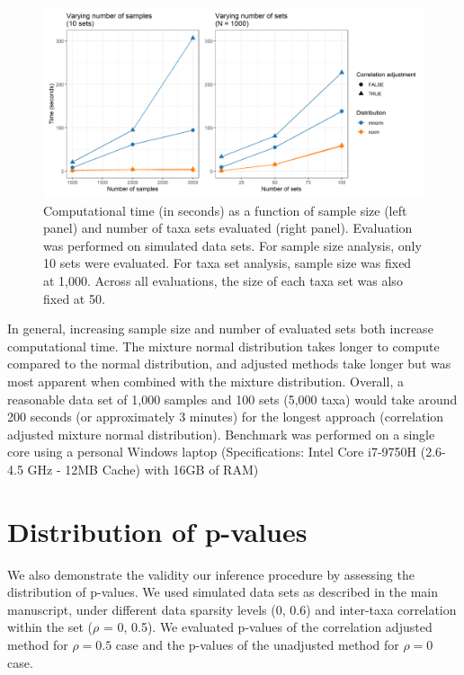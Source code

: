 \documentclass{article}
\begin{document}
\begin{figure}[!ht]
    \centering
    \includegraphics[width=\textwidth]{figures/performance.png}
    \caption{Computational time (in seconds) as a function of sample size (left panel) and number of taxa sets evaluated (right panel). Evaluation was performed on simulated data sets. For sample size analysis, only 10 sets were evaluated. For taxa set analysis, sample size was fixed at 1,000. Across all evaluations, the size of each taxa set was also fixed at 50.}
    \label{fig:s6}
\end{figure}

In general, increasing sample size and number of evaluated sets both increase computational time. The mixture normal distribution takes longer to compute compared to the normal distribution, and adjusted methods take longer but was most apparent when combined with the mixture distribution. Overall, a reasonable data set of 1,000 samples and 100 sets (5,000 taxa) would take around 200 seconds (or approximately 3 minutes) for the longest approach (correlation adjusted mixture normal distribution). Benchmark was performed on a single core using a personal Windows laptop (Specifications: Intel Core i7-9750H (2.6-4.5 GHz - 12MB Cache) with 16GB of RAM)

\section{Distribution of p-values}
We also demonstrate the validity our inference procedure by assessing the distribution of p-values. We used simulated data sets as described in the main manuscript, under different data sparsity levels (0, 0.6) and inter-taxa correlation within the set ($\rho$ = 0, 0.5). We evaluated p-values of the correlation adjusted method for $\rho = 0.5$ case and the p-values of the unadjusted method for $\rho = 0$ case.  
\end{document}
